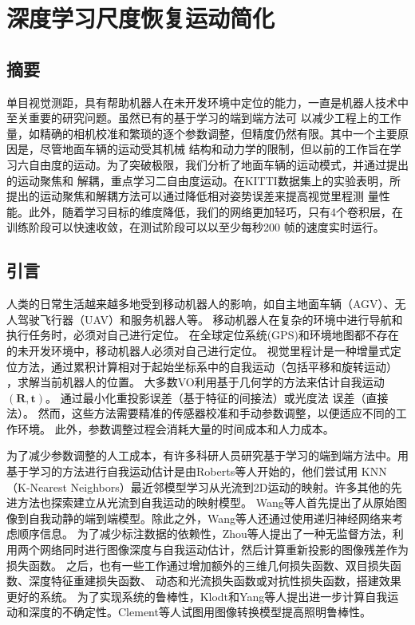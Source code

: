 \chapter{深度学习尺度恢复运动简化} %
\section{摘要}
单目视觉测距，具有帮助机器人在未开发环境中定位的能力，一直是机器人技术中至关重要的研究问题。虽然已有的基于学习的端到端方法可
以减少工程上的工作量，如精确的相机校准和繁琐的逐个参数调整，但精度仍然有限。其中一个主要原因是，尽管地面车辆的运动受其机械
结构和动力学的限制，但以前的工作旨在学习六自由度的运动。为了突破极限，我们分析了地面车辆的运动模式，并通过提出的运动聚焦和
解耦，重点学习二自由度运动。在KITTI数据集上的实验表明，所提出的运动聚焦和解耦方法可以通过降低相对姿势误差来提高视觉里程测
量性能。此外，随着学习目标的维度降低，我们的网络更加轻巧，只有4个卷积层，在训练阶段可以快速收敛，在测试阶段可以以至少每秒200
帧的速度实时运行。

\section{引言}
人类的日常生活越来越多地受到移动机器人的影响，如自主地面车辆（AGV）、无人驾驶飞行器（UAV）和服务机器人等。
移动机器人在复杂的环境中进行导航和执行任务时，必须对自己进行定位。
在全球定位系统(GPS)和环境地图都不存在的未开发环境中，移动机器人必须对自己进行定位。
视觉里程计是一种增量式定位方法，通过累积计算相对于起始坐标系中的自我运动（包括平移和旋转运动）
，求解当前机器人的位置。
大多数VO利用基于几何学的方法来估计自我运动$(\mathbf{R},\mathbf{t})$。
通过最小化重投影误差\cite{raul2015orb}（基于特征的间接法）或光度法 
误差\cite{Engel-et-al-pami2018}（直接法）。
然而，这些方法需要精准的传感器校准和手动参数调整，以便适应不同的工作环境\cite{roberts2008memory}。
此外，参数调整过程会消耗大量的时间成本和人力成本。

为了减少参数调整的人工成本，有许多科研人员研究基于学习的端到端方法中。用基于学习的方法进行自我运动估计是由Roberts等人开始的\cite{roberts2008memory}，他们尝试用
KNN（K-Nearest Neighbors）最近邻模型学习从光流到2D运动的映射。许多其他的先进方法也探索建立从光流到自我运动的映射模型\cite{guizilini2012semi,costante2016exploring,pillai2017towards,costante2018ls}。
Wang等人\cite{wang2017deepvo,wang2018end}首先提出了从原始图像到自我动静的端到端模型。除此之外，Wang等人还通过使用递归神经网络来考虑顺序信息。
为了减少标注数据的依赖性，Zhou等人\cite{zhou2017unsupervised}提出了一种无监督方法，利用两个网络同时进行图像深度与自我运动估计，然后计算重新投影的图像残差作为损失函数。
之后，也有一些工作通过增加额外的三维几何损失函数\cite{mahjourian2018unsupervised}、双目损失函数\cite{li2018undeepvo}、深度特征重建损失函数\cite{zhan2018unsupervised}、
动态和光流损失函数\cite{yin2018geonet}或对抗性损失函数\cite{almalioglu2019ganvo}，搭建效果更好的系统。
为了实现系统的鲁棒性，Klodt\cite{klodt2018supervising}和Yang等人\cite{yang2020d3vo}提出进一步计算自我运动和深度的不确定性。Clement等人\cite{clement2018train}试图用图像转换模型提高照明鲁棒性。

